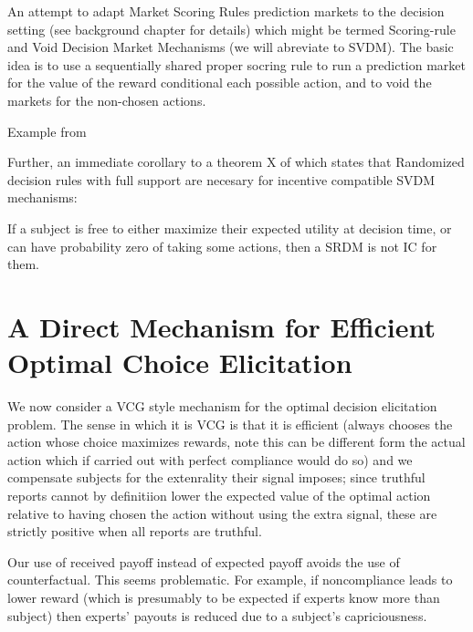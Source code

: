 An attempt to adapt Market Scoring Rules prediction markets to the decision setting (see background chapter for details) which might be termed Scoring-rule and Void Decision Market Mechanisms (we will abreviate to SVDM). The basic idea is to use a sequentially shared proper socring rule to run a prediction market for the value of the reward conditional each possible action, and to void the markets for the non-chosen actions.  


\begin{eg}
	Example from \cite{othman2010decision}
\end{eg}


  

Further, an immediate corollary to a theorem X of \cite{chen2014eliciting} which states that Randomized decision rules with full support are necesary for incentive compatible SVDM mechanisms:

If a subject is free to either maximize their expected utility at decision time, or can have probability zero of taking some actions, then a SRDM is not IC for them.



\section{A Direct Mechanism for Efficient Optimal Choice Elicitation}

We now consider a VCG style mechanism for the optimal decision elicitation problem. The sense in which it is VCG is that it is efficient (always chooses the action whose choice maximizes rewards, note this can be different form the actual action which if carried out with perfect compliance would do so) and we compensate subjects for the extenrality their signal imposes; since truthful reports cannot by definitiion lower the expected value of the optimal action relative to having chosen the action without using the extra signal, these are strictly positive when all reports are truthful. 

Our use of received payoff instead of expected payoff avoids the use of counterfactual. This seems problematic. For example, if noncompliance leads to lower reward (which is presumably to be expected if experts know more than subject) then experts' payouts is reduced due to a subject's capriciousness. 

